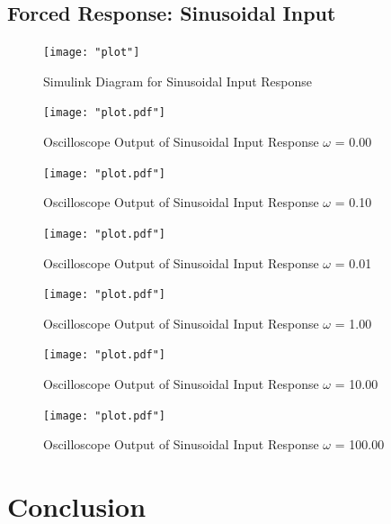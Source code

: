 \documentclass[12pt]{article}
\begin{document}
		\subsection{Forced Response: Sinusoidal Input}
			\begin{figure}[H]
				\centering
				\texttt{[image: "plot"]} %
				\caption{Simulink Diagram for Sinusoidal Input Response}
				\label{fig:slx_sine_input_diagram}
			\end{figure}
		
			\begin{figure}[H]
				\centering
				\texttt{[image: "plot.pdf"]} 
				\caption{Oscilloscope Output of Sinusoidal Input Response $\omega$ = 0.00}
				\label{fig:slx_sine_input_output_w_0}
			\end{figure}	
				
			\begin{figure}[H]
				\centering
				\texttt{[image: "plot.pdf"]} 
				\caption{Oscilloscope Output of Sinusoidal Input Response $\omega$ = 0.10}
				\label{fig:slx_sine_input_output_w_0_10}
			\end{figure}	
		
			\begin{figure}[H]
				\centering
				\texttt{[image: "plot.pdf"]} 
				\caption{Oscilloscope Output of Sinusoidal Input Response $\omega$ = 0.01}
				\label{fig:slx_sine_input_output_w_0_01}
			\end{figure}
		
			\begin{figure}[H]
				\centering
				\texttt{[image: "plot.pdf"]} 
				\caption{Oscilloscope Output of Sinusoidal Input Response $\omega$ = 1.00}
				\label{fig:slx_sine_input_output_w_1}
			\end{figure}
			
			\begin{figure}[H]
				\centering
				\texttt{[image: "plot.pdf"]} 
				\caption{Oscilloscope Output of Sinusoidal Input Response $\omega$ = 10.00}
				\label{fig:slx_sine_input_output_w_10}
			\end{figure}
					
			\begin{figure}[H]
				\centering
				\texttt{[image: "plot.pdf"]} 
				\caption{Oscilloscope Output of Sinusoidal Input Response $\omega$ = 100.00}
				\label{fig:slx_sine_input_output_w_100}
			\end{figure}
		
		
	\section{Conclusion}
\end{document}
